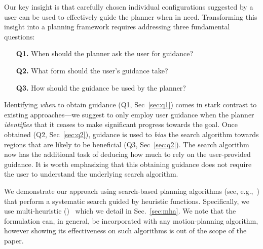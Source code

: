 \documentclass{article}
\begin{document}
Our key insight is that carefully chosen individual configurations suggested by a user can be used to effectively guide the planner when in need.
Transforming this insight into a planning framework requires addressing three fundamental questions:

\begin{itemize}
	\item[\textbf{Q1.}] When should the planner ask the user for guidance?
	\item[\textbf{Q2.}] What form should the user's guidance take?
	\item[\textbf{Q3.}] How should the guidance be used by the planner?
\end{itemize}

Identifying \emph{when} to obtain guidance 
(Q1, Sec~\ref{sec:q1}) 
comes in stark contrast to existing approaches---we suggest to only employ user guidance when the planner \emph{identifies} that it ceases to make significant progress towards the goal.
Once obtained (Q2, Sec~\ref{sec:q2}), guidance is used to \emph{bias} the search algorithm towards regions that are likely to be beneficial (Q3, Sec~\ref{sec:q2}). 
The search algorithm now has the additional task of deducing how much to rely on the user-provided guidance.
It is worth emphasizing that this obtaining guidance does not require the user to understand the underlying search algorithm. 

% 



%
We demonstrate our approach using search-based planning algorithms (see, e.g.,~\cite{CCL14}) that perform a systematic search guided by heuristic functions.
Specifically, we use multi-heuristic \astar (\mhastar)~\cite{ASNHL16,NAL15} which we detail in Sec.~\ref{sec:mha}.
We note that the formulation can, in general, be incorporated with any motion-planning algorithm, however showing its effectiveness on such algorithms is out of the scope of the paper.
\end{document}
